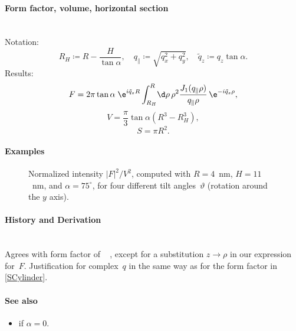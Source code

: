 \paragraph{Form factor, volume, horizontal section}\strut\\
Notation:
\begin{equation*}
  R_H \coloneqq R-\dfrac{H}{\tan \alpha}, \quad
  q_{\parallel} \coloneqq \sqrt{q_x^2+ q_y^2}, \quad
  \tilde{q}_z \coloneqq q_z \tan\alpha.
\end{equation*}
Results:
\begin{equation*}
  F = 2\pi \tan\alpha\; \e^{i\tilde{q}_z R}
      \int_{R_H}^R \!\d\rho\, \rho^2
        \frac{J_1(q_{\parallel}\rho)}{q_{\parallel}\rho}\,\e^{-i\tilde{q}_z \rho},
\end{equation*}
\begin{equation*}
  V = \dfrac{\pi}{3}\tan\alpha  \left( R^3 - R_H^3\right),
\end{equation*}
\begin{equation*}
  S=\pi R^2.
\end{equation*}

\paragraph{Examples}\strut

\begin{figure}[H]
\begin{center}
\end{center}
\caption{Normalized intensity $|F|^2/V^2$,
computed with $R=4$~nm, $H=11$~nm, and $\alpha=75^\circ$,
for four different tilt angles~$\vartheta$ (rotation around the $y$ axis).}
\end{figure}

\paragraph{History and Derivation}\strut\\
Agrees with  form factor of \IsGISAXS\
\cite[Eq.~2.28]{Laz06} \cite[Eq.~225]{ReLL09},
except for a substitution $z\to\rho$ in our expression for~$F$.
Justification for complex~$q$ in the same way as for the  form factor
in \cref{SCylinder}.

\paragraph{See also}
\begin{itemize}
\item {} if $\alpha=0$.
\end{itemize}


